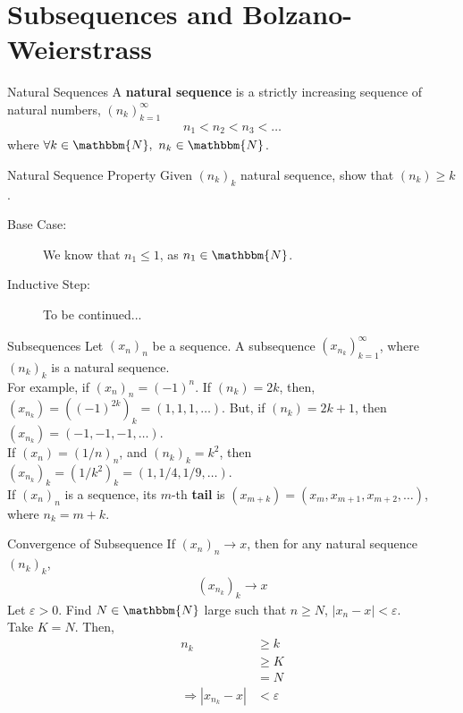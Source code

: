\documentclass[10pt]{extarticle}
\newcommand{\N}{\mathbbm{N}}
\begin{document}
  \section*{Subsequences and Bolzano-Weierstrass}%
  \begin{problem}{Natural Sequences}
    A \textbf{natural sequence} is a strictly increasing sequence of natural numbers, $(n_{k})_{k=1}^{\infty}$
    \begin{align*}
      n_{1} < n_2 < n_3<\dots
    \end{align*}
    where $\forall k\in\N,~n_k\in\N$.
    \begin{problem}{Natural Sequence Property}
      Given $(n_k)_k$ natural sequence, show that $(n_k) \geq k$.
      \tcblower
      \begin{description}
        \item[Base Case:] We know that $n_1 \leq 1$, as $n_1\in\N$.
        \item[Inductive Step:] To be continued...
      \end{description}
    \end{problem}
  \end{problem}
  \begin{problem}{Subsequences}
    Let $(x_n)_n$ be a sequence. A subsequence $(x_{n_k})_{k=1}^{\infty}$, where $(n_k)_{k}$ is a natural sequence.\\

    For example, if $(x_n)_n = (-1)^n$. If $(n_k) = 2k$, then, $(x_{n_k}) = \left((-1)^{2k}\right)_k = (1,1,1,\dots)$. But, if $(n_k) = 2k+1$, then $(x_{n_k}) = (-1,-1,-1,\dots)$.\\

    If $(x_n) = (1/n)_n$, and $(n_k)_k = k^2$, then $(x_{n_k})_{k} = (1/k^2)_{k} = (1,1/4,1/9,\dots)$.\\

    If $(x_n)_n$ is a sequence, its $m$-th \textbf{tail} is $(x_{m+k}) = (x_m,x_{m+1},x_{m+2},\dots)$, where $n_k = m+k$.
  \end{problem}
  \begin{problem}{Convergence of Subsequence}
    If $(x_n)_n \rightarrow x$, then for any natural sequence $(n_k)_k$,
    \begin{align*}
      \left(x_{n_k}\right)_k \rightarrow x
    \end{align*}
    \tcblower
    Let $\varepsilon > 0$. Find $N\in\N$ large such that $n \geq N$, $|x_{n} - x| < \varepsilon$.\\

    Take $K = N$. Then,
    \begin{align*}
      n_k &\geq k\\
      &\geq K\\
      &= N\\
      \Rightarrow |x_{n_k} - x| &< \varepsilon
    \end{align*}
  \end{problem}
\end{document}
